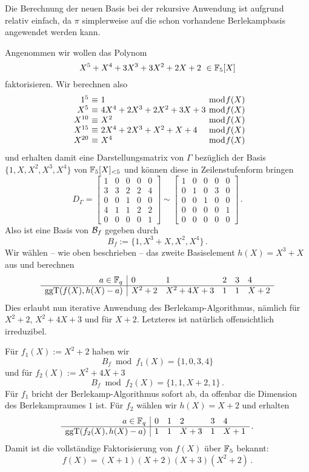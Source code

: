 
Die Berechnung der neuen Basis bei der rekursive Anwendung ist aufgrund
 relativ einfach, da $\pi$ simplerweise auf die schon
vorhandene Berlekampbasis angewendet werden kann.

\begin{beispiel}
  Angenommen wir wollen das Polynom 
  \[ X^5 + X^4 + 3 X^3 + 3 X^2 + 2 X + 2 \ \in \mathbb{F}_5[X]\]
  faktorisieren. Wir berechnen also
  \[ \begin{array}{r@{\ \equiv\ }l@{\ \bmod f(X)}}
    1^5 & 1\\
    X^5 & 4X^4 + 2X^3 + 2 X^2+ 3X + 3\\
    X^{10} & X^2\\
    X^{15} & 2X^4 + 2X^3 + X^2 + X + 4\\
    X^{20} & X^4
  \end{array} \]
  und erhalten damit eine Darstellungsmatrix von $\Gamma$ bezüglich der Basis 
  $\{ 1, X, X^2, X^3, X^4\}$ von $\mathbb{F}_5[X]_{<5}$ und können diese in
  Zeilenstufenform bringen
  \[ D_\Gamma = \begin{bmatrix}
      1& 0& 0& 0& 0\\ 
      3& 3& 2& 2& 4\\ 
      0& 0& 1& 0& 0\\ 
      4& 1& 1& 2& 2\\ 
      0& 0& 0& 0& 1\end{bmatrix} \sim 
      \begin{bmatrix}
      1& 0& 0& 0& 0\\ 
      0& 1& 0& 3& 0\\ 
      0& 0& 1& 0& 0\\ 
      0& 0& 0& 0& 1\\
      0& 0& 0& 0& 0\end{bmatrix}\,. \]
  Also ist eine Basis von $\mathcal{B}_f$ gegeben durch
  \[ B_f := \{ 1, X^3 +X, X^2, X^4\}\,.\]
  Wir wählen -- wie oben beschrieben -- das zweite Basiselement $h(X) = X^3 +X$
  aus und berechnen
  \[ \begin{array}{r|lllll}
      a\in \mathbb{F}_q & 0 & 1 & 2 & 3 & 4 \\\hline
      \operatorname{ggT}(f(X), h(X)-a) & X^2+2 & X^2+4X+3 & 1 & 1 & X+2\end{array}\]
  Dies erlaubt nun iterative Anwendung des Berlekamp-Algorithmus, nämlich für 
  $X^2+2$, $X^2+4X+3$ und für $X+2$. Letzteres ist natürlich offensichtlich 
  irreduzibel.

  Für $f_1(X) := X^2+2$ haben wir 
  \[ B_f \bmod f_1(X) = \{ 1, 0, 3, 4\}\]
  und für $f_2(X) := X^2+4X+3$
  \[ B_f \bmod f_2(X) = \{1,1,X+2,1\}\,.\]
  Für $f_1$ bricht der Berlekamp-Algorithmus sofort ab, da offenbar die
  Dimension des Berlekampraumes $1$ ist.
  Für $f_2$ wählen wir $h(X) = X+2$ und erhalten 
  \[ \begin{array}{r|lllll}
      a\in \mathbb{F}_q & 0 & 1 & 2 & 3 & 4 \\\hline
      \operatorname{ggT}(f_2(X), h(X)-a) & 1 & 1 & X+3 & 1 & X+1\end{array}\,.\]
  Damit ist die vollständige Faktorisierung von $f(X)$ über $\mathbb{F}_5$ bekannt:
  \[ f(X) = (X+1)(X+2)(X+3)(X^2+2)\,.\]
\end{beispiel}


